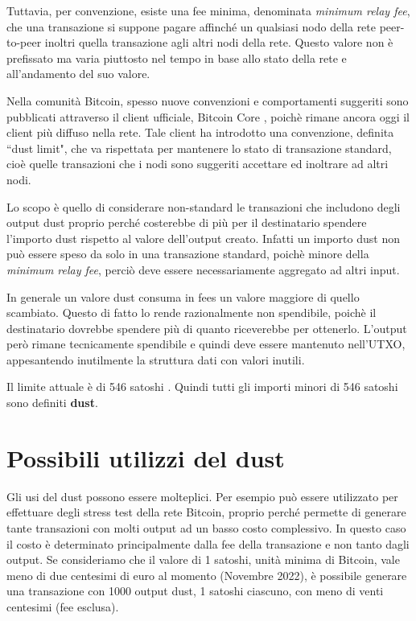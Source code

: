 Tuttavia, per convenzione, esiste una fee minima, denominata \textit{minimum relay fee}, che una transazione si suppone pagare affinché un qualsiasi nodo della rete peer-to-peer inoltri quella transazione agli altri nodi della rete. Questo valore non è prefissato ma varia piuttosto nel tempo in base allo stato della rete e all'andamento del suo valore. 

Nella comunità Bitcoin, spesso nuove convenzioni e comportamenti suggeriti sono pubblicati attraverso il client ufficiale, Bitcoin Core \cite{btccore}, poichè rimane ancora oggi il client più diffuso nella rete.  Tale client ha introdotto una convenzione, definita ``dust limit", che va rispettata per mantenere lo stato di transazione standard, cioè quelle transazioni che i nodi sono suggeriti accettare ed inoltrare ad altri nodi.

Lo scopo è quello di considerare non-standard le transazioni che includono degli output dust proprio perché costerebbe di più per il destinatario spendere l'importo dust rispetto al valore dell'output creato. Infatti un importo dust non può essere speso da solo in una transazione standard, poichè minore della \textit{minimum relay fee}, perciò deve essere necessariamente aggregato ad altri input.

In generale un valore dust consuma in fees un valore maggiore di quello scambiato. Questo di fatto lo rende razionalmente non spendibile, poichè il destinatario dovrebbe spendere più di quanto riceverebbe per ottenerlo. L'output però rimane tecnicamente spendibile e quindi deve essere mantenuto nell'UTXO, appesantendo inutilmente la struttura dati con valori inutili.

Il limite attuale è di 546 satoshi \cite{BtcDev}. Quindi tutti gli importi minori di 546 satoshi sono definiti \textbf{dust}.

\section{Possibili utilizzi del dust}

Gli usi del dust possono essere molteplici. Per esempio può essere utilizzato per effettuare degli stress test della rete Bitcoin, proprio perché permette di generare tante transazioni con molti output ad un basso costo complessivo. In questo caso il costo è determinato principalmente dalla fee della transazione e non tanto dagli output. Se consideriamo che il valore di 1 satoshi, unità minima di Bitcoin, vale meno di due centesimi di euro al momento (Novembre 2022), è possibile generare una transazione con 1000 output dust, 1 satoshi ciascuno, con meno di venti centesimi (fee esclusa).

